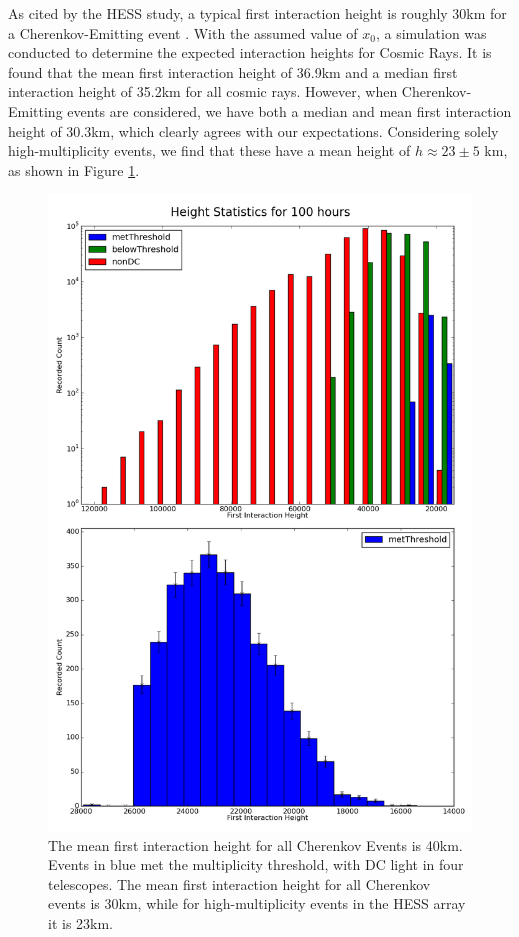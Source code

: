 \documentclass[11pt]{article}
\begin{document}
As cited by the HESS study, a typical first interaction height is roughly 30km for a Cherenkov-Emitting event \cite{hess07}. With the assumed value of $x_{0}$, a simulation was conducted to determine the expected interaction heights for Cosmic Rays. It is found that the mean first interaction height of 36.9km and a median first interaction height of 35.2km for all cosmic rays. However, when Cherenkov-Emitting events are considered, we have both a median and mean first interaction height of 30.3km, which clearly agrees with our expectations. Considering solely high-multiplicity events, we find that these have a mean height of $h \approx 23 \pm 5$ km, as shown in Figure \ref{fig:Hessheight}.

\begin{figure}
\begin{center}
\includegraphics[height=0.9\textheight]{hessheight}
\caption{The mean first interaction height for all Cherenkov Events is 40km. Events in blue met the multiplicity threshold, with DC light in four telescopes. The mean first interaction height for all Cherenkov events is 30km, while for high-multiplicity events in the HESS array it is 23km.}
\label{fig:Hessheight}
\end{center}
\end{figure}
\end{document}
